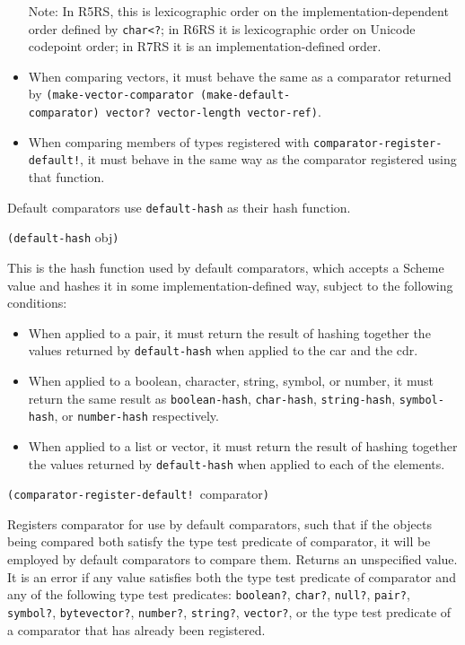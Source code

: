 \begin{itemize}
  Note: In R5RS, this is lexicographic order on the
  implementation-dependent order defined by \texttt{char\textless{}?};
  in R6RS it is lexicographic order on Unicode codepoint order; in R7RS
  it is an implementation-defined order.
\item
  When comparing vectors, it must behave the same as a comparator
  returned by
  \texttt{(make-vector-comparator\ (make-default-comparator)\ vector?\ vector-length\ vector-ref)}.
\item
  When comparing members of types registered with
  \texttt{comparator-register-default!}, it must behave in the same way
  as the comparator registered using that function.
\end{itemize}

Default comparators use \texttt{default-hash} as their hash function.

\texttt{(default-hash} obj\texttt{)}

This is the hash function used by default comparators, which accepts a
Scheme value and hashes it in some implementation-defined way, subject
to the following conditions:

\begin{itemize}
\tightlist
\item
  When applied to a pair, it must return the result of hashing together
  the values returned by \texttt{default-hash} when applied to the car
  and the cdr.
\item
  When applied to a boolean, character, string, symbol, or number, it
  must return the same result as \texttt{boolean-hash},
  \texttt{char-hash}, \texttt{string-hash}, \texttt{symbol-hash}, or
  \texttt{number-hash} respectively.
\item
  When applied to a list or vector, it must return the result of hashing
  together the values returned by \texttt{default-hash} when applied to
  each of the elements.
\end{itemize}

\texttt{(comparator-register-default!\ }comparator\texttt{)}

Registers comparator for use by default comparators, such that if the
objects being compared both satisfy the type test predicate of
comparator, it will be employed by default comparators to compare them.
Returns an unspecified value. It is an error if any value satisfies both
the type test predicate of comparator and any of the following type test
predicates: \texttt{boolean?}, \texttt{char?}, \texttt{null?},
\texttt{pair?}, \texttt{symbol?}, \texttt{bytevector?},
\texttt{number?}, \texttt{string?}, \texttt{vector?}, or the type test
predicate of a comparator that has already been registered.

